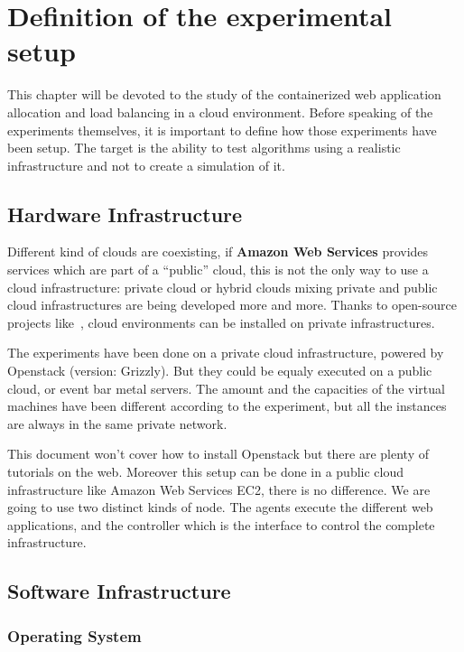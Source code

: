\chapter{Definition of the experimental setup}
\label{chap:expsetup}

This chapter will be devoted to the study of the containerized web application
allocation and load balancing in a cloud environment. Before speaking of the
experiments themselves, it is important to define how those experiments have
been setup. The target is the ability to test algorithms using a realistic
infrastructure and not to create a simulation of it.

\section{Hardware Infrastructure}

Different kind of clouds are coexisting, if \textbf{Amazon Web Services} provides
services which are part of a “public” cloud, this is not the only way to use a
cloud infrastructure: private cloud or hybrid clouds mixing private and public
cloud infrastructures are being developed more and more. Thanks to open-source
projects like~\cite{websiteOpenstack}, cloud environments can be installed on
private infrastructures.

The experiments have been done on a private cloud infrastructure, powered by
Openstack (version: Grizzly). But they could be equaly executed on a public
cloud, or event bar metal servers. The amount and the capacities of the virtual
machines have been different according to the experiment, but all the instances
are always in the same private network.

This document won't cover how to install Openstack but there are plenty of
tutorials on the web. Moreover this setup can be done in a public cloud
infrastructure like Amazon Web Services EC2, there is no difference. We are
going to use two distinct kinds of node. The agents execute the
different web applications, and the controller which is the interface to
control the complete infrastructure.

\section{Software Infrastructure}
\subsection{Operating System}

